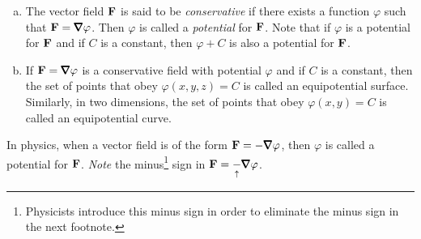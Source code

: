\begin{defn}\label{def:conservative}

\begin{enumerate}[(a)]
\item
The vector field $\mathbf{F}$ is said to be \emph{conservative} if there
exists a function $\varphi$ such that $\vF = \vnabla\varphi$. Then
$\varphi$ is called a \emph{potential} for $\mathbf{F}$. Note that if $\varphi$ 
is a potential for $\mathbf{F}$ and if $C$ is a constant, then $\varphi+C$
is also a potential for $\mathbf{F}$.

\item If $\vF=\vnabla\varphi$ is a conservative field with potential 
$\varphi$ and if $C$ is a constant, then the set of points that
obey $\varphi(x,y,z)=C$ is called an equipotential surface.
Similarly, in two dimensions, the set of points that
obey $\varphi(x,y)=C$ is called an equipotential curve.
\end{enumerate}
\end{defn}

\begin{warning}\label{warn:potential}
In physics,  when a vector field is of the form $\vF=-\vnabla\varphi$,
then $\varphi$ is called a potential for $\mathbf{F}$.
\emph{Note} the minus\footnote{Physicists introduce this minus sign in order to eliminate the minus sign in the next footnote.} sign in 
  $\vF=\underset{\uparrow}{-}\vnabla\varphi$. 
\end{warning}

